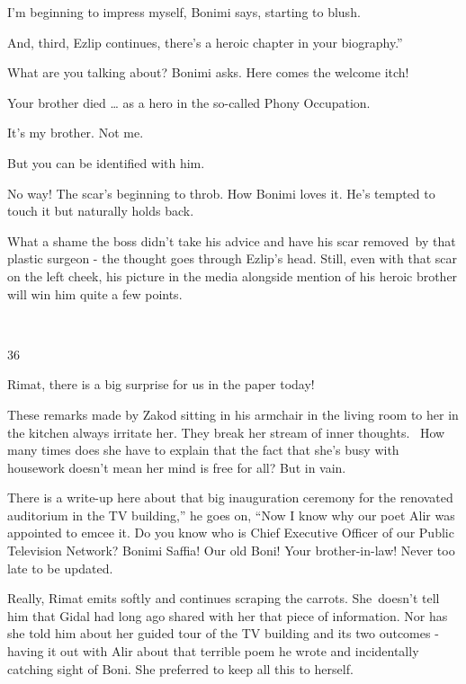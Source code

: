 \documentclass[letterpaper]{article}
\begin{document}
{\textquotedbl}I'm beginning to impress myself,{\textquotedbl} Bonimi says, {\textquotedbl}starting to
blush.{\textquotedbl} 

{\textquotedbl}And, third,{\textquotedbl} Ezlip continues, {\textquotedbl}there's a heroic chapter in your biography.''

{\textquotedbl}What are you talking about?{\textquotedbl} Bonimi asks. Here comes the welcome itch!~

{\textquotedbl}Your brother died {\dots} as a hero in the so-called Phony Occupation.{\textquotedbl} 

{\textquotedbl}It's my brother. Not me.{\textquotedbl} 

{\textquotedbl}But you can be identified with him.{\textquotedbl} 

{\textquotedbl}No way!{\textquotedbl} The scar's beginning to throb. How Bonimi loves it. He's tempted to touch it but
naturally holds back. 

What a shame the boss didn't take his advice and have his scar removed~by that plastic surgeon - the thought goes
through Ezlip's head. Still, even with that scar on the left cheek, his picture in the media alongside mention of his
heroic brother will win him quite a few points.

~

36 

{\textquotedbl}Rimat, there is a big surprise for us in the paper today!{\textquotedbl}

These remarks made by Zakod sitting in his armchair in the living room to her in the kitchen always irritate her. They
break her stream of inner thoughts. \textcolor[rgb]{0.30980393,0.5058824,0.7411765}{\ }How many times does she have to
explain\textcolor[rgb]{0.0,0.6901961,0.9411765}{ }that the fact that she's busy with housework doesn't mean her mind is
free for all? But in vain. 

{\textquotedbl}There is a write-up here about that big inauguration ceremony for the renovated auditorium in the TV
building,'' he goes on, ``Now I know why our poet Alir was appointed to emcee it. Do you know who is Chief Executive
Officer of our Public Television Network? Bonimi Saffia! Our old Boni! Your brother-in-law! Never too late to be
updated.{\textquotedbl} 

{\textquotedbl}Really,{\textquotedbl} Rimat emits softly and continues scraping the carrots. She~doesn't tell him that
Gidal had long ago shared with her that piece of information. Nor has she told him about her guided tour of the TV
building and its two outcomes - having it out with Alir about that terrible poem he wrote and incidentally catching
sight of Boni. She preferred to keep all this to herself. ~
\end{document}

